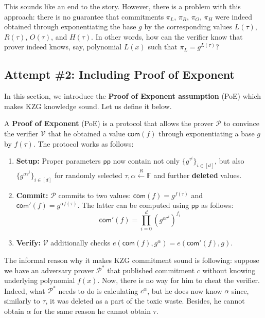 \documentclass[../lecture-notes.tex]{subfiles}
\begin{document}
This sounds like an end to the story. However, there is a problem with this approach: there is no guarantee that commitments $\pi_L$, $\pi_R$, $\pi_O$, $\pi_H$ were indeed obtained through exponentiating the base $g$ by the corresponding values $L(\tau)$, $R(\tau)$, $O(\tau)$, and $H(\tau)$. In other words, how can the verifier know that prover indeed knows, say, polynomial $L(x)$ such that $\pi_L = g^{L(\tau)}$?

\subsection{Attempt \#2: Including Proof of Exponent}

In this section, we introduce the \textbf{Proof of Exponent assumption} (PoE) which makes KZG knowledge sound. Let us define it below.

\begin{definition}
    A \textbf{Proof of Exponent} (PoE) is a protocol that allows the prover $\mathcal{P}$ to convince the verifier $\mathcal{V}$ that he obtained a value $\mathsf{com}(f)$ through exponentiating a base $g$ by $f(\tau)$. The protocol works as follows:
    \begin{enumerate}
        \item \textbf{Setup:} Proper parameters $\mathsf{pp}$ now contain not only $\{g^{\tau^i}\}_{i \in [d]}$, but also $\{g^{\alpha\tau^i}\}_{i \in [d]}$ for randomly selected $\tau,\alpha \xleftarrow{R} \mathbb{F}$ and further \textbf{deleted} values.
        \item \textbf{Commit:} $\mathcal{P}$ commits to two values: $\mathsf{com}(f) = g^{f(\tau)}$ and $\mathsf{com}'(f) = g^{\alpha f(\tau)}$. The latter can be computed using $\mathsf{pp}$ as follows:
        \begin{equation*}
            \mathsf{com}'(f) = \prod_{i=0}^d (g^{\alpha\tau^i})^{f_i}
        \end{equation*} 
        \item \textbf{Verify:} $\mathcal{V}$ additionally checks $e(\mathsf{com}(f),g^{\alpha}) = e(\mathsf{com}'(f), g)$.
    \end{enumerate}
\end{definition}

The informal reason why it makes KZG commitment sound is following: suppose we have an adversary prover $\mathcal{P}^*$ that published commitment $c$ without knowing underlying polynomial $f(x)$. Now, there is no way for him to cheat the verifier. 
Indeed, what $\mathcal{P}^*$ needs to do is calculating $c^{\alpha}$, but he does now know $\alpha$ since, similarly to $\tau$, it was deleted as a part of the toxic waste. Besides, he cannot obtain $\alpha$ for the same reason he cannot obtain $\tau$.
\end{document}
